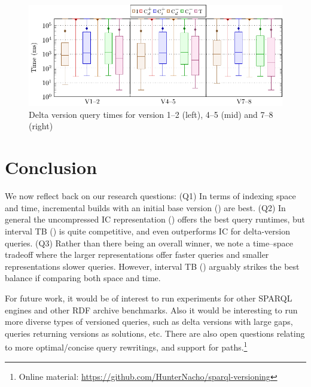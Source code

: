 \documentclass{llncs}
\begin{document}
\begin{figure}[t]
\includegraphics[scale=0.8]{plots/boxplt-dvq}
\caption{Delta version query times for version 1--2 (left), 4--5 (mid) and 7--8 (right) \label{fig:dvq}}
\end{figure}

\section{Conclusion}

We now reflect back on our research questions: (Q1) In terms of indexing space and time, incremental builds with an initial base version (\cbpd) are best. (Q2) In general the uncompressed IC representation (\ic) offers the best query runtimes, but interval TB (\tb) is quite competitive, and even outperforms IC for delta-version queries. (Q3) Rather than there being an overall winner, we note a time--space tradeoff where the larger representations offer faster queries and smaller representations slower queries. However, interval TB (\tb) arguably strikes the best balance if comparing both space and time.

For future work, it would be of interest to run experiments for other SPARQL engines and other RDF archive benchmarks. Also it would be interesting to run more diverse types of versioned queries, such as delta versions with large gaps, queries returning versions as solutions, etc. There are also open questions relating to more optimal/concise query rewritings, and support for paths.\footnote{Online material: \url{https://github.com/HunterNacho/sparql-versioning}}



\end{document}
